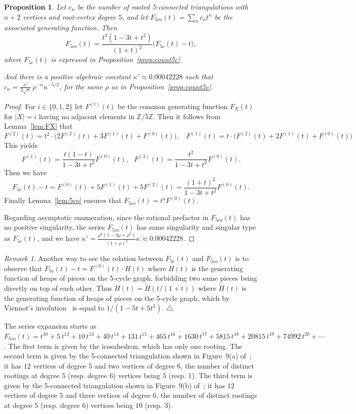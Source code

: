 \documentclass[letter]{amsart}
\numberwithin{theo}{section}
\newtheorem{prop}[theo]{Proposition}
\theoremstyle{remark}
\newtheorem{remark}[theo]{Remark}
\def\Ffc{F_{5c}}
\def\Ffco{F_{5co}}
\begin{document}
\begin{prop}\label{prop:count_5co}
Let $c_n$ be the number of rooted 5-connected triangulations with $n+2$ vertices and root-vertex degree $5$, and let $\Ffco(t)=\sum_nc_nt^n$ be the associated generating function. Then 
\[
\Ffco(t)=\frac{t^4(1-3t+t^2)}{(1+t)^2}\big(\Ffc(t)-t\big),
\]
where $\Ffc(t)$ is expressed in Proposition~\ref{prop:count5c}.

And there is a positive algebraic constant $\kappa'\approx 0.00042228$
 such that $c_n= \frac{\kappa'}{2\sqrt{\pi}}\,\rho^{-n}n^{-5/2}$, for the same $\rho$ as in Proposition~\ref{prop:count5c}. 
\end{prop}
\begin{proof}
For $i\in\{0,1,2\}$ let $F^{(i)}(t)$ be the common generating function $F_X(t)$ for $|X|=i$
having no adjacent elements in $\mathbb{Z}/5\mathbb{Z}$. Then it follows from Lemma~\ref{lem:FX}
that
\[
F^{(2)}(t)=t^2\cdot\big(2F^{(2)}(t)+3F^{(1)}(t)+F^{(0)}(t)\big),\ \ \ \ F^{(1)}(t)=t\cdot\big(F^{(2)}(t)+2F^{(1)}(t)+F^{(0)}(t)\big) 
\]
This yields
\[
F^{(1)}(t)=\frac{t(1-t)}{1-3t+t^2}F^{(0)}(t),\ \ \ F^{(2)}(t)=\frac{t^2}{1-3t+t^2}F^{(0)}(t).
\]
Then we have
\[
\Ffc(t)-t=F^{(0)}(t)+5F^{(1)}(t)+5F^{(2)}(t)=\frac{(1+t)^2}{1-3t+t^2}F^{(0)}(t).
\]
Finally Lemma~\ref{lem:5co} ensures that $\Ffco(t)=t^4F^{(0)}(t)$. 

Regarding asymptotic enumeration, since the rational prefactor in $\Ffco(t)$ has no positive singularity, the series $\Ffco(t)$ has same singularity and singular type as $\Ffc(t)$, and we have $\kappa'=\frac{\rho^4(1-3\rho+\rho^2)}{(1+\rho)^2}\kappa\approx 0.00042228$.  
\end{proof}

\begin{remark}\label{rk:heaps}
Another way to see the relation between $\Ffc(t)$ and $\Ffco(t)$ is to observe that $\Ffc(t)-t=F^{(0)}(t)\cdot H(t)$ where $H(t)$ is the generating function of heaps of pieces on the 5-cycle graph, forbidding two same pieces being directly on top of each other. Thus $H(t)=\widetilde{H}(t/(1+t))$ where $\widetilde{H}(t)$ is the generating function of heaps of pieces on the 5-cycle graph, which by Viennot's involution~\cite{viennot2006heaps} is equal to $1/(1-5t+5t^2)$.  \hfill$\triangle$
\end{remark}

The series expansion starts as $\Ffco(t)=t^{10}+ 5\,t^{12}+ 10\,t^{13}+ 40\,t^{14}+ 131\,t^{15}+ 465\,t^{16}+ 1630\,t^{17}+ 5815\,t^{18}+ 20815\,t^{19}+74992\,t^{20}+\cdots$. The first term is given by the icosahedron, which has only one rooting. The second term is given by the 5-connected triangulation shown in Figure~9(a) of~\cite{gao2001}; it has $12$ vertices of degree $5$ and two vertices of degree $6$, the number of distinct rootings at degree $5$ (resp. degree $6$) vertices being $5$ (resp. $1$). The third term is given by the 5-connected triangulation shown in Figure~9(b) of~\cite{gao2001}; it has $12$ vertices of degree $5$ and three vertices of degree $6$, the number of distinct rootings at degree $5$ (resp. degree $6$) vertices being $10$ (resp. $3$). 
\end{document}
